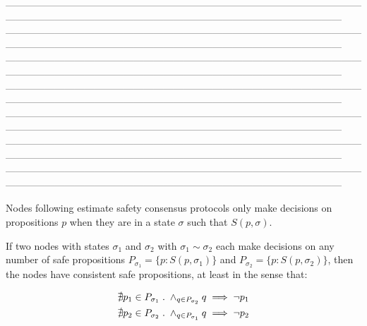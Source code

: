 \documentclass{article}
\theoremstyle{definition}
\begin{document}
------------------------------------------------------------------------------------------------------------------------------------------------------------------------------------------------------------------
------------------------------------------------------------------------------------------------------------------------------------------------------------------------------------------------------------------
------------------------------------------------------------------------------------------------------------------------------------------------------------------------------------------------------------------
------------------------------------------------------------------------------------------------------------------------------------------------------------------------------------------------------------------
------------------------------------------------------------------------------------------------------------------------------------------------------------------------------------------------------------------
------------------------------------------------------------------------------------------------------------------------------------------------------------------------------------------------------------------
------------------------------------------------------------------------------------------------------------------------------------------------------------------------------------------------------------------

\fi

\iffalse



Nodes following estimate safety consensus protocols only make decisions on propositions $p$ when they are in a state $\sigma$ such that $S(p,\sigma)$.

If two nodes with states $\sigma_1$ and $\sigma_2$ with $\sigma_1 \sim \sigma_2$ each make decisions on any number of safe propositions $P_{\sigma_1} = \{p: S(p,\sigma_1)\}$ and $P_{\sigma_2} = \{p: S(p,\sigma_2)\}$, then the nodes have consistent safe propositions, at least in the sense that:

\begin{align*}
\nexists p_1 \in P_{\sigma_1} \hspace{1mm} &. \hspace{1mm} \land_{q \in P_{\sigma_2}} q \implies \neg{p_1} \\
\nexists p_2 \in P_{\sigma_2} \hspace{1mm} &. \hspace{1mm} \land_{q \in P_{\sigma_1}} q \implies \neg{p_2}
\end{align*}
\end{document}
